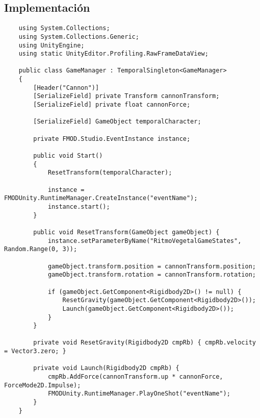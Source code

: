 \newpage

\subsection{Implementación} \label{code:implementation}

\begin{lstlisting}
	using System.Collections;
	using System.Collections.Generic;
	using UnityEngine;
	using static UnityEditor.Profiling.RawFrameDataView;
	
	public class GameManager : TemporalSingleton<GameManager>
	{
		[Header("Cannon")]
		[SerializeField] private Transform cannonTransform;
		[SerializeField] private float cannonForce;
		
		[SerializeField] GameObject temporalCharacter;
		
		private FMOD.Studio.EventInstance instance;
		
		public void Start()
		{
			ResetTransform(temporalCharacter);
			
			instance = FMODUnity.RuntimeManager.CreateInstance("eventName");
			instance.start();
		}
		
		public void ResetTransform(GameObject gameObject) {
			instance.setParameterByName("RitmoVegetalGameStates", Random.Range(0, 3));
			
			gameObject.transform.position = cannonTransform.position;
			gameObject.transform.rotation = cannonTransform.rotation;
			
			if (gameObject.GetComponent<Rigidbody2D>() != null) { 
				ResetGravity(gameObject.GetComponent<Rigidbody2D>());
				Launch(gameObject.GetComponent<Rigidbody2D>()); 
			}
		}
		
		private void ResetGravity(Rigidbody2D cmpRb) { cmpRb.velocity = Vector3.zero; }
		
		private void Launch(Rigidbody2D cmpRb) { 
			cmpRb.AddForce(cannonTransform.up * cannonForce, ForceMode2D.Impulse);
			FMODUnity.RuntimeManager.PlayOneShot("eventName");
		}
	}
\end{lstlisting}

